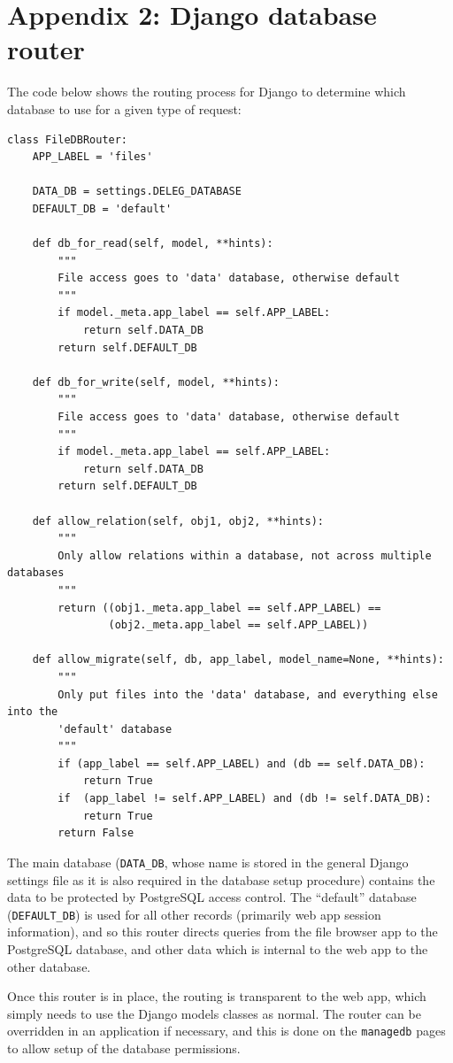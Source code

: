 \documentclass{report}
\begin{document}
\chapter*{Appendix 2: Django database router}
\label{sec:appendix2}
The code below shows the routing process for Django to determine which database to use for a given type of request:

\begin{verbatim}
class FileDBRouter:
    APP_LABEL = 'files'

    DATA_DB = settings.DELEG_DATABASE
    DEFAULT_DB = 'default'

    def db_for_read(self, model, **hints):
        """
        File access goes to 'data' database, otherwise default
        """
        if model._meta.app_label == self.APP_LABEL:
            return self.DATA_DB
        return self.DEFAULT_DB

    def db_for_write(self, model, **hints):
        """
        File access goes to 'data' database, otherwise default
        """
        if model._meta.app_label == self.APP_LABEL:
            return self.DATA_DB
        return self.DEFAULT_DB

    def allow_relation(self, obj1, obj2, **hints):
        """
        Only allow relations within a database, not across multiple databases
        """
        return ((obj1._meta.app_label == self.APP_LABEL) ==
                (obj2._meta.app_label == self.APP_LABEL))

    def allow_migrate(self, db, app_label, model_name=None, **hints):
        """
        Only put files into the 'data' database, and everything else into the
        'default' database
        """
        if (app_label == self.APP_LABEL) and (db == self.DATA_DB):
            return True
        if  (app_label != self.APP_LABEL) and (db != self.DATA_DB):
            return True
        return False
\end{verbatim}

The main database (\verb+DATA_DB+, whose name is stored in the general Django settings file as it is also required in the database setup procedure) contains the data to be protected by PostgreSQL access control. The ``default'' database (\verb+DEFAULT_DB+) is used for all other records (primarily web app session information), and so this router directs queries from the file browser app to the PostgreSQL database, and other data which is internal to the web app to the other database.

Once this router is in place, the routing is transparent to the web app, which simply needs to use the Django models classes as normal. The router can be overridden in an application if necessary, and this is done on the \verb+managedb+ pages to allow setup of the database permissions.
\end{document}

